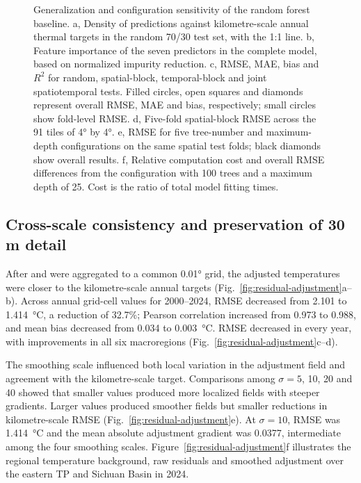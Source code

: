 \begin{figure}[H]
\centering
{}
\ReviewFloatBegin
\caption{Generalization and configuration sensitivity of the random forest baseline. a, Density of predictions against kilometre-scale annual thermal targets in the random 70/30 test set, with the 1:1 line. b, Feature importance of the seven predictors in the complete model, based on normalized impurity reduction. c, RMSE, MAE, bias and $R^2$ for random, spatial-block, temporal-block and joint spatiotemporal tests. Filled circles, open squares and diamonds represent overall RMSE, MAE and bias, respectively; small circles show fold-level RMSE. d, Five-fold spatial-block RMSE across the 91 tiles of 4° by 4°. e, RMSE for five tree-number and maximum-depth configurations on the same spatial test folds; black diamonds show overall results. f, Relative computation cost and overall RMSE differences from the configuration with 100 trees and a maximum depth of 25. Cost is the ratio of total model fitting times.}
\label{fig:rf-validation}
\ReviewFloatEnd
\end{figure}

\subsection{Cross-scale consistency and preservation of 30 m detail}

After \rf{} and \chinatherm{} were aggregated to a common 0.01° grid, the adjusted temperatures were closer to the kilometre-scale annual targets (Fig.~\ref*{fig:residual-adjustment}a--b). Across annual grid-cell values for 2000--2024, RMSE decreased from 2.101 to 1.414~°C, a reduction of 32.7\%; Pearson correlation increased from 0.973 to 0.988, and mean bias decreased from 0.034 to 0.003~°C. RMSE decreased in every year, with improvements in all six macroregions (Fig.~\ref*{fig:residual-adjustment}c--d).

The smoothing scale influenced both local variation in the adjustment field and agreement with the kilometre-scale target. Comparisons among $\sigma=5$, 10, 20 and 40 showed that smaller values produced more localized fields with steeper gradients. Larger values produced smoother fields but smaller reductions in kilometre-scale RMSE (Fig.~\ref*{fig:residual-adjustment}e). At $\sigma=10$, RMSE was 1.414~°C and the mean absolute adjustment gradient was 0.0377, intermediate among the four smoothing scales. Figure~\ref*{fig:residual-adjustment}f illustrates the regional temperature background, raw residuals and smoothed adjustment over the eastern TP and Sichuan Basin in 2024.

